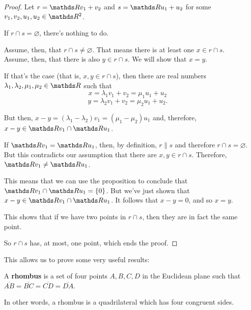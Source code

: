 \begin{proof}
	Let $r=\R v_1+v_2$ and $s=\R u_1+u_2$ for some $v_1,v_2,u_1,u_2\in \R^2$.
	
	If $r\cap s=\varnothing$, there's nothing to do.
	
	Assume, then, that $r\cap s\neq\varnothing$. That means there is at least one $x\in r\cap s$. Assume, then, that there is also $y\in r\cap s$. We will show that $x=y$.
	
	If that's the case (that is, $x,y\in r\cap s$), then there are real numbers $\lambda_1,\lambda_2,\mu_1,\mu_2\in\R$ such that
	\[x=\lambda_1v_1+v_2=\mu_1u_1+u_2\]
	\[y=\lambda_2v_1+v_2=\mu_2u_1+u_2.\]
	
	But then, $x-y=(\lambda_1-\lambda_2)v_1=(\mu_1-\mu_2)u_1$ and, therefore, $x-y\in\R v_1\cap \R u_1$.
	
	If $\R v_1=\R u_1$, then, by definition, $r\parallel s$ and therefore $r\cap s=\varnothing$. But this contradicts our assumption that there are $x,y\in r\cap s$. Therefore, $\R v_1\neq \R u_1$.
	
	This means that we can use the proposition to conclude that $\R v_1\cap \R u_1=\{0\}$. But we've just shown that $x-y\in \R v_1\cap \R u_1$. It follows that $x-y=0$, and so $x=y$.
	
	This shows that if we have two points in $r\cap s$, then they are in fact the same point.
	
	So $r\cap s$ has, at most, one point, which ends the proof.
\end{proof}

This allows us to prove some very useful results:

\begin{df}
	A \textbf{rhombus} is a set of four points $A,B,C,D$ in the Euclidean plane such that $\overline{AB}=\overline{BC}=\overline{CD}=\overline{DA}$.
	
	In other words, a rhombus is a quadrilateral which has four congruent sides.
\end{df}

